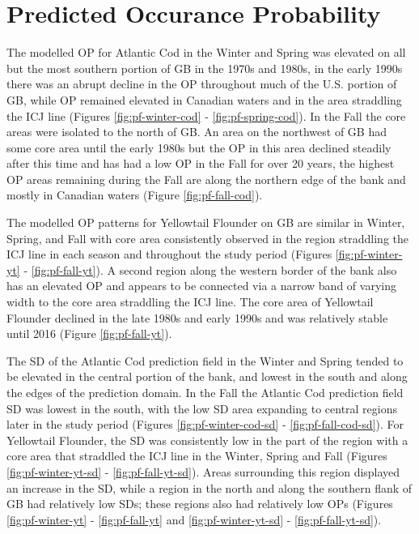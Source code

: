 \documentclass[
]{article}
\begin{document}
\clearpage

\hypertarget{predicted-occurance-probability}{%
\section{Predicted Occurance Probability}\label{predicted-occurance-probability}}

The modelled OP for Atlantic Cod in the Winter and Spring was elevated on all but the most southern portion of GB in the 1970s and 1980s, in the early 1990s there was an abrupt decline in the OP throughout much of the U.S. portion of GB, while OP remained elevated in Canadian waters and in the area straddling the ICJ line (Figures \ref{fig:pf-winter-cod} - \ref{fig:pf-spring-cod}). In the Fall the core areas were isolated to the north of GB. An area on the northwest of GB had some core area until the early 1980s but the OP in this area declined steadily after this time and has had a low OP in the Fall for over 20 years, the highest OP areas remaining during the Fall are along the northern edge of the bank and mostly in Canadian waters (Figure \ref{fig:pf-fall-cod}).

The modelled OP patterns for Yellowtail Flounder on GB are similar in Winter, Spring, and Fall with core area consistently observed in the region straddling the ICJ line in each season and throughout the study period (Figures \ref{fig:pf-winter-yt} - \ref{fig:pf-fall-yt}). A second region along the western border of the bank also has an elevated OP and appears to be connected via a narrow band of varying width to the core area straddling the ICJ line. The core area of Yellowtail Flounder declined in the late 1980s and early 1990s and was relatively stable until 2016 (Figure \ref{fig:pf-fall-yt}).

The SD of the Atlantic Cod prediction field in the Winter and Spring tended to be elevated in the central portion of the bank, and lowest in the south and along the edges of the prediction domain. In the Fall the Atlantic Cod prediction field SD was lowest in the south, with the low SD area expanding to central regions later in the study period (Figures \ref{fig:pf-winter-cod-sd} - \ref{fig:pf-fall-cod-sd}). For Yellowtail Flounder, the SD was consistently low in the part of the region with a core area that straddled the ICJ line in the Winter, Spring and Fall (Figures \ref{fig:pf-winter-yt-sd} - \ref{fig:pf-fall-yt-sd}). Areas surrounding this region displayed an increase in the SD, while a region in the north and along the southern flank of GB had relatively low SDs; these regions also had relatively low OPs (Figures \ref{fig:pf-winter-yt} - \ref{fig:pf-fall-yt} and \ref{fig:pf-winter-yt-sd} - \ref{fig:pf-fall-yt-sd}).
\end{document}
